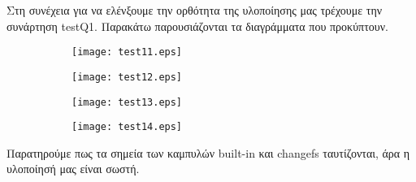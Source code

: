 \noindent
\begin{minipage}{\linewidth}
\par Στη συνέχεια για να ελένξουμε την ορθότητα της υλοποίησης μας τρέχουμε την 
συνάρτηση testQ1. Παρακάτω παρουσιάζονται τα διαγράμματα που προκύπτουν.
\begin{figure}[H]
    \centering
\begin{subfigure}[h]{0.49\textwidth}
  \centering
  \texttt{[image: test11.eps]}
  \caption{}
\end{subfigure}
\begin{subfigure}[h]{0.49\textwidth}\centering
  \centering
  \texttt{[image: test12.eps]}
  \caption{}
  \end{subfigure}
\begin{subfigure}[h]{0.49\textwidth}
  \centering
  \texttt{[image: test13.eps]}
  \caption{}
\end{subfigure}
\begin{subfigure}[h]{0.49\textwidth}\centering
  \centering
  \texttt{[image: test14.eps]}
  \caption{}
  \end{subfigure}
\end{figure}

\par Παρατηρούμε πως τα σημεία των καμπυλών built-in και changefs ταυτίζονται, 
άρα η υλοποίησή μας είναι σωστή.
\end{minipage}
